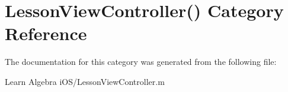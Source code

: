 \hypertarget{category_lesson_view_controller_07_08}{\section{Lesson\-View\-Controller() Category Reference}
\label{category_lesson_view_controller_07_08}
}


The documentation for this category was generated from the following file\-:\begin{DoxyCompactItemize}
\item 
Learn Algebra i\-O\-S/Lesson\-View\-Controller.\-m\end{DoxyCompactItemize}
